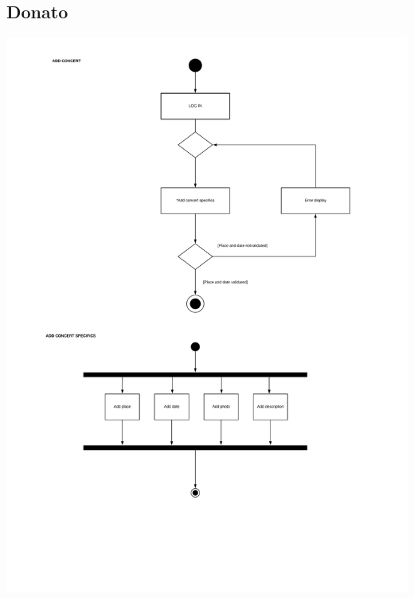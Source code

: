 \documentclass[11pt,a4paper]{article}
\begin{document}
\begin{itemize}
\subsection{Donato}
\includegraphics[scale=0.5]{addconcertdiagram.jpg}

\end{itemize}
\end{document}
